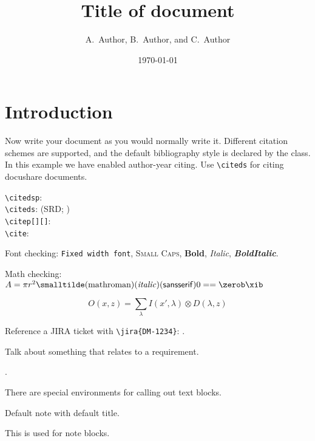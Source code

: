 \documentclass[DM,lsstdraft,authoryear,toc]{lsstdoc}
\title[Short title]{Title of document}
\author{
A.~Author,
B.~Author,
and
C.~Author}
\date{\today}
\begin{document}
\maketitle

\section{Introduction}

Now write your document as you would normally write it.
Different citation schemes are supported, and the default bibliography style is declared by the class.
In this example we have enabled author-year citing.
Use \verb|\citeds| for citing docushare documents.

\verb|\citedsp|:  \\
\verb|\citeds|: (SRD; ) \\
\verb|\citep[][]|: \citep[e.g.,][are interesting]{2009arXiv0912.0201L,2016SPIE.9913E..0GJ} \\
\verb|\cite|: \cite{LPM-51,Wang:2011:QDS:2063348.2063364}

Font checking: \texttt{Fixed width font}, \textsc{Small Caps}, \textbf{Bold}, \textit{Italic}, \textbf{\textit{BoldItalic}}.

Math checking: $A = \pi r^2 \smalltilde\mathrm{(math roman)}\mathit{(italic)}\mathsf{(sans serif)} 0 == \zerob \xib$

\begin{equation}
O(x, z) = \sum_\lambda I(x',\lambda) \otimes D(\lambda, z)
\end{equation}

Reference a JIRA ticket with \verb|\jira{DM-1234}|: .

Talk about something that relates to a requirement.

 .


There are special environments for calling out text blocks.

\begin{note}
  Default note with default title.
\end{note}

\begin{note}
  This is used for note blocks.
\end{note}
\end{document}
